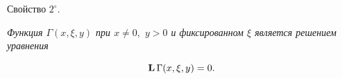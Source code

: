  

 \smallskip

\hypertarget{sv2o}{}


{\small\sc Свойство $2^\circ.$}

{\it Функция $\Gamma(x,\xi,y)$ при  $x\neq 0,$ $y>0$  и фиксированном $\xi$  является решением уравнения}

\begin{equation}\label{GammaOdn}

{\bf L}\,\Gamma(x,\xi,y)=0.

\end{equation}



\smallskip




